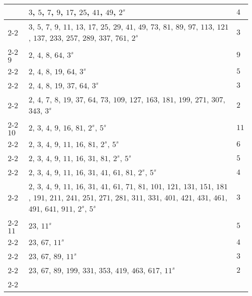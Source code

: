 \documentclass[11pt,reqno]{amsart}
\begin{document}
\begin{longtable}{ | p{1.8cm} | p{12cm} | p{1.8cm} | }
	      			  & $3$, $5$, $7$, $9$, $17$, $25$, $41$, $49$, $2^s$ & $4$ \\ \cline{2-2}  \cline{3-3}
                  	      & $3$, $5$, $7$, $9$, $11$, $13$, $17$, $25$, $29$, $41$, $49$, $73$, $81$, $89$, $97$, $113$, $121$, $137$, $233$, $257$, $289$, $337$, $761$, $2^s$ & $3$ \\ \cline{2-2}  \cline{3-3} \hline \hline 
\multirow{4}{*}{} $9$ & $2$, $4$, $8$, $64$, $3^s$ & $9$  \\ \cline{2-2} \cline{3-3} 
                  	       & $2$, $4$, $8$, $19$, $64$, $3^s$ & $5$ \\ \cline{2-2} \cline{3-3} 
	      			  & $2$, $4$, $8$, $19$, $37$, $64$, $3^s$ & $3$ \\  \cline{2-2} \cline{3-3} 
                  	       & $2$, $4$, $7$, $8$, $19$, $37$, $64$, $73$, $109$, $127$, $163$, $181$, $199$, $271$, $307$, $343$, $3^s$  & $2$ \\ \cline{2-2}  \cline{3-3} \hline \hline      
\multirow{5}{*}{} $10$ & $2$, $3$, $4$, $9$, $16$, $81$, $2^s$, $5^s$ & $11$ \\ \cline{2-2} \cline{3-3} 
                  	           & $2$, $3$, $4$, $9$, $11$, $16$, $81$, $2^s$, $5^s$ & $6$ \\ \cline{2-2} \cline{3-3} 
	      			      & $2$, $3$, $4$, $9$, $11$, $16$, $31$, $81$, $2^s$, $5^s$ & $5$ \\ \cline{2-2} \cline{3-3} 
				 	      & $2$, $3$, $4$, $9$, $11$, $16$, $31$, $41$, $61$, $81$, $2^s$, $5^s$ & $4$ \\ \cline{2-2} \cline{3-3} 
                  	           & $2$, $3$, $4$, $9$, $11$, $16$, $31$, $41$, $61$, $71$, $81$, $101$, $121$, $131$, $151$, $181$, $191$, $211$, $241$, $251$, $271$, $281$, $311$, $331$, $401$, $421$, $431$, $461$, $491$, $641$, $911$, $2^s$, $5^s$ & $3$ \\ \cline{2-2}  \cline{3-3} \hline \hline
\multirow{4}{*}{} $11$ & $23$, $11^s$ & $5$ \\ \cline{2-2} \cline{3-3} 
                  	           & $23$, $67$, $11^s$ & $4$ \\ \cline{2-2} \cline{3-3} 
	      			      & $23$, $67$, $89$, $11^s$ & $3$ \\ \cline{2-2} \cline{3-3} 
				 	      & $23$, $67$, $89$, $199$, $331$, $353$, $419$, $463$, $617$, $11^s$ & $2$ \\ \cline{2-2} \cline{3-3} \hline
\end{longtable}
\end{document}
